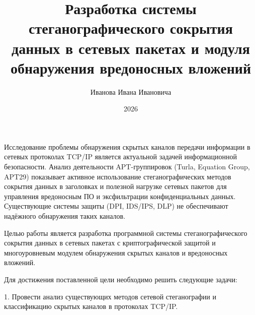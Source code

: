 \documentclass[bachelor, och, assignment]{SCWorks}
\begin{document}

\title{Разработка системы стеганографического сокрытия данных в сетевых пакетах и модуля обнаружения вредоносных вложений}




\author{Иванова Ивана Ивановича}







\date{2026}

\maketitle

Исследование проблемы обнаружения скрытых каналов передачи информации в сетевых протоколах TCP/IP является актуальной задачей информационной безопасности. Анализ деятельности APT-группировок (Turla, Equation Group, APT29) показывает активное использование стеганографических методов сокрытия данных в заголовках и полезной нагрузке сетевых пакетов для управления вредоносным ПО и эксфильтрации конфиденциальных данных. Существующие системы защиты (DPI, IDS/IPS, DLP) не обеспечивают надёжного обнаружения таких каналов.

Целью работы является разработка программной системы стеганографического сокрытия данных в сетевых пакетах с криптографической защитой и многоуровневым модулем обнаружения скрытых каналов и вредоносных вложений.

Для достижения поставленной цели необходимо решить следующие задачи:

1. Провести анализ существующих методов сетевой стеганографии и классификацию скрытых каналов в протоколах TCP/IP.
\end{document}
